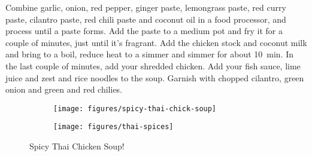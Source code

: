 Combine garlic, onion, red pepper, ginger paste, lemongrass paste, red curry
paste, cilantro paste, red chili paste and coconut oil in a food processor, and
process until a paste forms. Add the paste to a medium pot and fry it for a
couple of minutes, just until it's fragrant. Add the chicken stock and coconut
milk and bring to a boil, reduce heat to a simmer and simmer for about
\SI{10}{\minute}. In the last couple of minutes, add your shredded chicken. Add
your fish sauce, lime juice and zest and rice noodles to the soup. Garnish with
chopped cilantro, green onion and green and red chilies.
\begin{figure}
    \centering
    \begin{subfigure}{0.5\textwidth}
        \centering
        \texttt{[image: figures/spicy-thai-chick-soup]}
    \end{subfigure}
    \begin{subfigure}{0.37\textwidth}
        \centering
        \texttt{[image: figures/thai-spices]}
    \end{subfigure}
    \caption*{Spicy Thai Chicken Soup!}
\end{figure}
